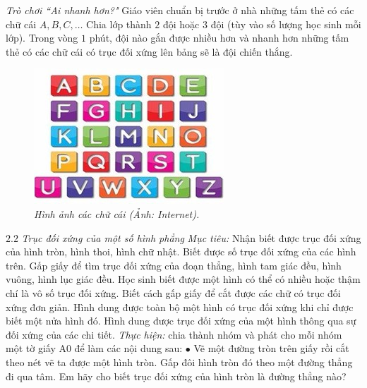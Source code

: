 \begin{multicols}{2}
	\vskip 0.1cm
	\textit{Trò chơi ``Ai nhanh hơn?"}
	\vskip 0.1cm
	Giáo viên chuẩn bị trước ở nhà những tấm thẻ có các chữ cái $A, B, C,\ldots$ Chia lớp thành $2$ đội hoặc $3$ đội (tùy vào số lượng học sinh mỗi lớp). Trong vòng $1$ phút, đội nào gắn được nhiều hơn và nhanh hơn những tấm thẻ có các chữ cái có trục đối xứng lên bảng sẽ là đội chiến thắng.
	\vskip 0.1cm
	\begin{figure}[H]
		\vspace*{-5pt}
		\centering
		\captionsetup{labelformat= empty, justification=centering}
		\includegraphics[width= 1\linewidth]{4}
		\caption{\small\textit{\color{diendantoanhoc}Hình ảnh các chữ cái (Ảnh: Internet).}}
		\vspace*{-10pt}
	\end{figure}
	$2.2$ \textit{Trục đối xứng của một số hình phẳng}
	\vskip 0.1cm
	\textit{Mục tiêu:} Nhận biết được trục đối xứng của hình tròn, hình thoi, hình chữ nhật. Biết được số trục đối xứng của các hình trên. Gấp giấy để tìm trục đối xứng của đoạn thẳng, hình tam giác đều, hình vuông, hình lục giác đều. Học sinh biết được một hình có thể có nhiều hoặc thậm chí là vô số trục đối xứng. Biết cách gấp giấy để cắt được các chữ có trục đối xứng đơn giản. Hình dung được toàn bộ một hình có trục đối xứng khi chỉ được biết một nửa hình đó. Hình dung được trục đối xứng của một hình thông qua sự đối xứng của các chi tiết.
	\vskip 0.1cm
	\textit{Thực hiện:} chia thành nhóm và phát cho mỗi nhóm một tờ giấy A$0$ để làm các nội dung sau:
	\vskip 0.1cm
	$\bullet$	Vẽ một đường tròn trên giấy rồi cắt theo nét vẽ ta được một hình tròn. Gấp đôi hình tròn đó theo một đường thẳng đi qua tâm. Em hãy cho biết trục đối xứng của hình tròn là đường thẳng nào?

\end{multicols}
